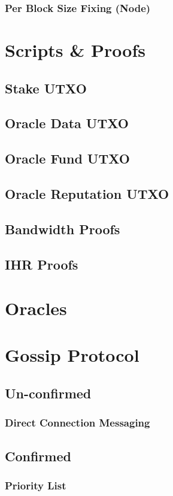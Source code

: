 \documentclass[a4paper,11pt]{article}
\begin{document}
\subsubsection{Per Block Size Fixing (Node)}

\section{Scripts \& Proofs}
\subsection{Stake UTXO}
\subsection{Oracle Data UTXO}
\subsection{Oracle Fund UTXO}
\subsection{Oracle Reputation UTXO}
\subsection{Bandwidth Proofs}
\subsection{IHR Proofs}

\section{Oracles}


\section{Gossip Protocol}
\subsection{Un-confirmed}
\subsubsection{Direct Connection Messaging}
\subsection{Confirmed}
\subsubsection{Priority List}
\end{document}
